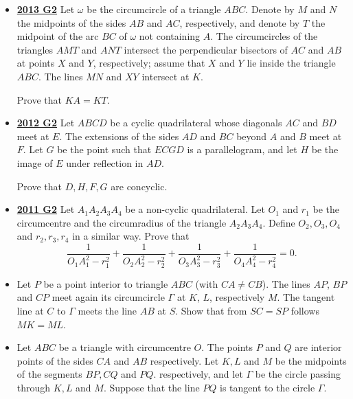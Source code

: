 \documentclass[11pt]{scrartcl}
\begin{document}
\begin{itemize}[leftmargin=*]
Prove that it is possible to choose two of the triangles $ALM, BMK,$ and $CKL$ whose inradii sum up to at least the inradius of the triangle $ABC$.
\item \href{https://artofproblemsolving.com/community/c6h597143p3543487}{\textbf{2013 G2}} Let $\omega$ be the circumcircle of a triangle $ABC$. Denote by $M$ and $N$ the midpoints of the sides $AB$ and $AC$, respectively, and denote by $T$ the midpoint of the arc $BC$ of $\omega$ not containing $A$. The circumcircles of the triangles $AMT$ and $ANT$ intersect the perpendicular bisectors of $AC$ and $AB$ at points $X$ and $Y$, respectively; assume that $X$ and $Y$ lie inside the triangle $ABC$. The lines $MN$ and $XY$ intersect at $K$. 

Prove that $KA=KT$.
\newpage

\item \href{https://artofproblemsolving.com/community/c6h546176p3160578}{\textbf{2012 G2}} 	Let $ABCD$ be a cyclic quadrilateral whose diagonals $AC$ and $BD$ meet at $E$. The extensions of the sides $AD$ and $BC$ beyond $A$ and $B$ meet at $F$. Let $G$ be the point such that $ECGD$ is a parallelogram, and let $H$ be the image of $E$ under reflection in $AD$. 

Prove that $D,H,F,G$ are concyclic.

\item \href{https://artofproblemsolving.com/community/c6h488825p2739321}{\textbf{2011 G2}} 	Let $A_1A_2A_3A_4$ be a non-cyclic quadrilateral. Let $O_1$ and $r_1$ be the circumcentre and the circumradius of the triangle $A_2A_3A_4$. Define $O_2,O_3,O_4$ and $r_2,r_3,r_4$ in a similar way. Prove that \[\frac{1}{O_1A_1^2-r_1^2}+\frac{1}{O_2A_2^2-r_2^2}+\frac{1}{O_3A_3^2-r_3^2}+\frac{1}{O_4A_4^2-r_4^2}=0.\]
\item {}  Let $P$ be a point interior to triangle $ABC$ (with $CA \neq CB$). The lines $AP$, $BP$ and $CP$ meet again its circumcircle $\Gamma$ at $K$, $L$, respectively $M$. The tangent line at $C$ to $\Gamma$ meets the line $AB$ at $S$. Show that from $SC = SP$ follows $MK = ML$.
\item {}  	Let $ ABC$ be a triangle with circumcentre $ O$. The points $ P$ and $ Q$ are interior points of the sides $ CA$ and $ AB$ respectively. Let $ K,L$ and $ M$ be the midpoints of the segments $ BP,CQ$ and $ PQ$. respectively, and let $ \Gamma$ be the circle passing through $ K,L$ and $ M$. Suppose that the line $ PQ$ is tangent to the circle $ \Gamma$. 


\end{itemize}
\end{document}
